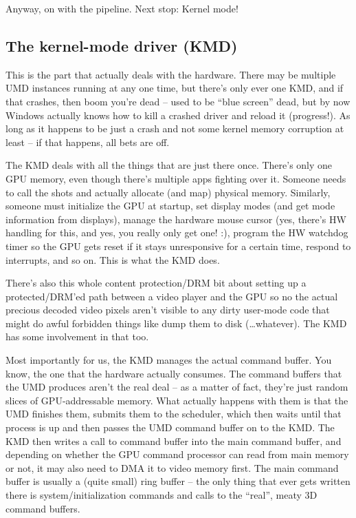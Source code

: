 \documentclass[12pt]{article}
\begin{document}
Anyway, on with the pipeline. Next stop: Kernel mode!

\subsection{The kernel-mode driver (KMD)}
\label{sec:org9abc1ba}
This is the part that actually deals with the hardware.
There may be multiple UMD instances running at any one time, but there’s only ever one KMD, and if that crashes, then boom you’re dead – used to be “blue screen” dead, but by now Windows actually knows how to kill a crashed driver and reload it (progress!).
As long as it happens to be just a crash and not some kernel memory corruption at least – if that happens, all bets are off.

The KMD deals with all the things that are just there once.
There’s only one GPU memory, even though there’s multiple apps fighting over it.
Someone needs to call the shots and actually allocate (and map) physical memory.
Similarly, someone must initialize the GPU at startup, set display modes (and get mode information from displays), manage the hardware mouse cursor (yes, there’s HW handling for this, and yes, you really only get one! :), program the HW watchdog timer so the GPU gets reset if it stays unresponsive for a certain time, respond to interrupts, and so on.
This is what the KMD does.

There’s also this whole content protection/DRM bit about setting up a protected/DRM’ed path between a video player and the GPU so no the actual precious decoded video pixels aren’t visible to any dirty user-mode code that might do awful forbidden things like dump them to disk (…whatever).
The KMD has some involvement in that too.

Most importantly for us, the KMD manages the actual command buffer.
You know, the one that the hardware actually consumes.
The command buffers that the UMD produces aren’t the real deal – as a matter of fact, they’re just random slices of GPU-addressable memory.
What actually happens with them is that the UMD finishes them, submits them to the scheduler, which then waits until that process is up and then passes the UMD command buffer on to the KMD.
The KMD then writes a call to command buffer into the main command buffer, and depending on whether the GPU command processor can read from main memory or not, it may also need to DMA it to video memory first.
The main command buffer is usually a (quite small) ring buffer – the only thing that ever gets written there is system/initialization commands and calls to the “real”, meaty 3D command buffers.
\end{document}
